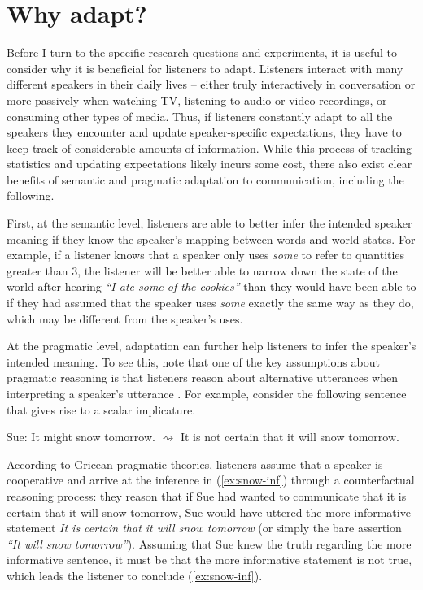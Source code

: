 \section{Why adapt?}
\label{sec:why-adapt}

Before I turn to the specific research questions and experiments, it is useful to consider why it is beneficial for listeners to adapt. Listeners interact with many different speakers in their daily lives -- either truly interactively in conversation or more passively when watching TV, listening to audio or video recordings, or consuming other types of media. Thus, if listeners constantly adapt to all the speakers they encounter and update speaker-specific expectations, they have to keep track of considerable amounts of information. While this process of tracking statistics and updating expectations likely incurs some cost, there also exist clear benefits of semantic and pragmatic adaptation to communication, including the following.

First, at the semantic level, listeners are able to better infer the intended speaker meaning if they know the speaker's mapping between words and world states. For example, if a listener knows that a speaker only uses \emph{some} to refer to quantities greater than 3, the listener will be better able to narrow down the state of the world after hearing \emph{``I ate some of the cookies''} than they would have been able to if they had assumed that the speaker uses \emph{some} exactly the same way as they do, which may be different from the speaker's uses.

At the pragmatic level, adaptation can further help listeners to infer the speaker's intended meaning. To see this, note that one of the key assumptions about pragmatic reasoning is that listeners reason about alternative utterances when interpreting a speaker's utterance \cite{Grice1975, Horn1984}. For example, consider the following sentence that gives rise to a scalar implicature.

\begin{exe}
\ex Sue: It might snow tomorrow.
\ex \label{ex:snow-inf} $\rightsquigarrow$  It is not certain that it will snow tomorrow.
\end{exe}

According to Gricean pragmatic theories, listeners assume that a speaker is cooperative and arrive at the inference in (\ref{ex:snow-inf}) through a counterfactual reasoning process: they reason that if Sue had wanted to communicate that it is certain that it will snow tomorrow, Sue would have uttered the more informative statement \textit{It is certain that it will snow tomorrow} (or simply the bare assertion \emph{``It will snow tomorrow''}). Assuming that Sue knew the truth regarding the more informative sentence, it must be that the more informative statement is not true, which leads the listener to conclude (\ref{ex:snow-inf}). 

